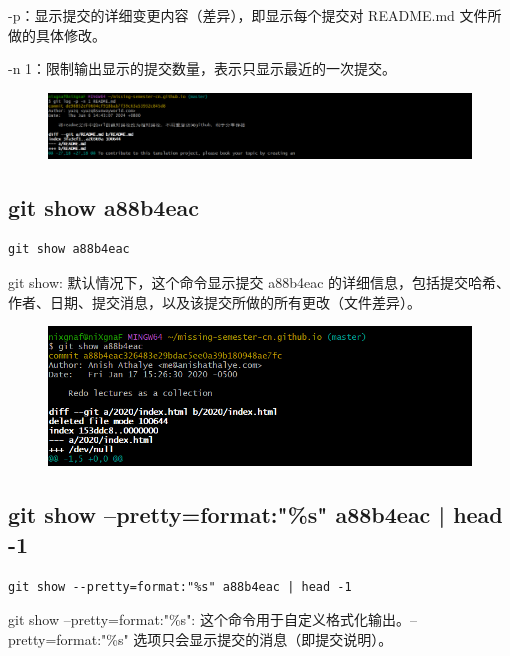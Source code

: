 \documentclass{article}
\begin{document}
\noindent -p：显示提交的详细变更内容（差异），即显示每个提交对 README.md 文件所做的具体修改。

\noindent -n 1：限制输出显示的提交数量，表示只显示最近的一次提交。

\begin{figure}[h]
    \centering
    \includegraphics[width=1\linewidth]{picture/gitlog1.png}
\end{figure}

\subsection{git show a88b4eac}
\lstset{language=bash}
\begin{lstlisting}
git show a88b4eac
\end{lstlisting}

\noindent git show: 默认情况下，这个命令显示提交 a88b4eac 的详细信息，包括提交哈希、作者、日期、提交消息，以及该提交所做的所有更改（文件差异）。

\begin{figure}[h]
    \centering
    \includegraphics[width=1\linewidth]{picture/gitshow4.png}
\end{figure}

\subsection{git show --pretty=format:"\%s" a88b4eac | head -1}
\lstset{language=bash}
\begin{lstlisting}
git show --pretty=format:"%s" a88b4eac | head -1
\end{lstlisting}

\noindent git show --pretty=format:"\%s": 这个命令用于自定义格式化输出。--pretty=format:"\%s" 选项只会显示提交的消息（即提交说明）。
\end{document}
